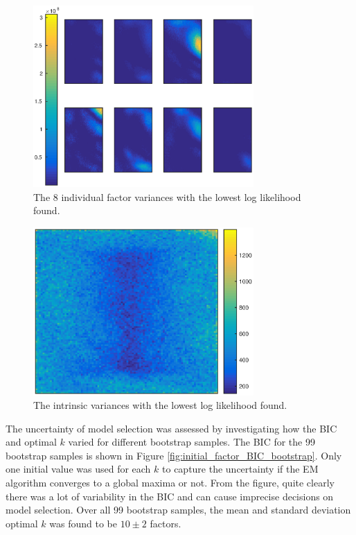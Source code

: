 \documentclass[12pt]{report}
\begin{document}
\begin{figure}
	\centering
	\includegraphics[width=0.75\textwidth]{figures/initial_factor_factorNoise.eps}
	\caption{The 8 individual factor variances with the lowest log likelihood found.}
	\label{fig:initial_factor_factorNoise}
\end{figure}

\begin{figure}
	\centering
	\includegraphics[width=0.75\textwidth]{figures/initial_factor_instrinicNoise.eps}
	\caption{The intrinsic variances with the lowest log likelihood found.}
	\label{fig:initial_factor_instrinicNoise}
\end{figure}

The uncertainty of model selection was assessed by investigating how the BIC and optimal $k$ varied for different bootstrap samples. The BIC for the 99 bootstrap samples is shown in Figure \ref{fig:initial_factor_BIC_bootstrap}. Only one initial value was used for each $k$ to capture the uncertainty if the EM algorithm converges to a global maxima or not. From the figure, quite clearly there was a lot of variability in the BIC and can cause imprecise decisions on model selection. Over all 99 bootstrap samples, the mean and standard deviation optimal $k$ was found to be $10\pm2$ factors.
\end{document}
